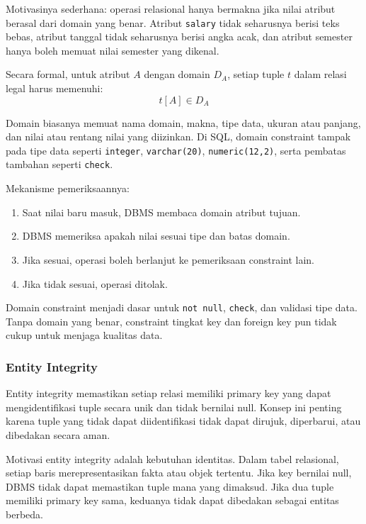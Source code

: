 Motivasinya sederhana: operasi relasional hanya bermakna jika nilai atribut berasal dari domain yang benar. Atribut \texttt{salary} tidak seharusnya berisi teks bebas, atribut tanggal tidak seharusnya berisi angka acak, dan atribut semester hanya boleh memuat nilai semester yang dikenal.

Secara formal, untuk atribut \(A\) dengan domain \(D_A\), setiap tuple \(t\) dalam relasi legal harus memenuhi:
\begin{equation}
    t[A] \in D_A
    \label{eq:domain-constraint}
\end{equation}

Domain biasanya memuat nama domain, makna, tipe data, ukuran atau panjang, dan nilai atau rentang nilai yang diizinkan. Di SQL, domain constraint tampak pada tipe data seperti \texttt{integer}, \texttt{varchar(20)}, \texttt{numeric(12,2)}, serta pembatas tambahan seperti \texttt{check}.

Mekanisme pemeriksaannya:
\begin{enumerate}
    \item Saat nilai baru masuk, DBMS membaca domain atribut tujuan.
    \item DBMS memeriksa apakah nilai sesuai tipe dan batas domain.
    \item Jika sesuai, operasi boleh berlanjut ke pemeriksaan constraint lain.
    \item Jika tidak sesuai, operasi ditolak.
\end{enumerate}

Domain constraint menjadi dasar untuk \texttt{not null}, \texttt{check}, dan validasi tipe data. Tanpa domain yang benar, constraint tingkat key dan foreign key pun tidak cukup untuk menjaga kualitas data.

\subsubsection{Entity Integrity}

\begin{jawab}
Entity integrity memastikan setiap relasi memiliki primary key yang dapat mengidentifikasi tuple secara unik dan tidak bernilai null. Konsep ini penting karena tuple yang tidak dapat diidentifikasi tidak dapat dirujuk, diperbarui, atau dibedakan secara aman.
\end{jawab}

Motivasi entity integrity adalah kebutuhan identitas. Dalam tabel relasional, setiap baris merepresentasikan fakta atau objek tertentu. Jika key bernilai null, DBMS tidak dapat memastikan tuple mana yang dimaksud. Jika dua tuple memiliki primary key sama, keduanya tidak dapat dibedakan sebagai entitas berbeda.


